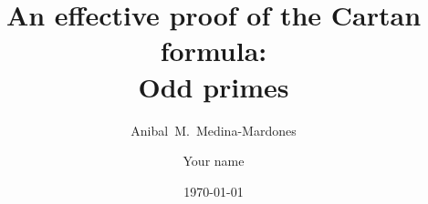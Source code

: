 \documentclass{amsart}
\title[An effective proof of the Cartan formula: Odd primes]{An effective proof of the Cartan formula:\\Odd primes}
\author[A.~Medina-Mardones]{Anibal~M.~Medina-Mardones}
\author[Your short name]{Your name}
\date{\today}
\begin{document}
	
	\maketitle
	
	
	
	
	
	
	
	\sloppy
	\printbibliography
\end{document}
